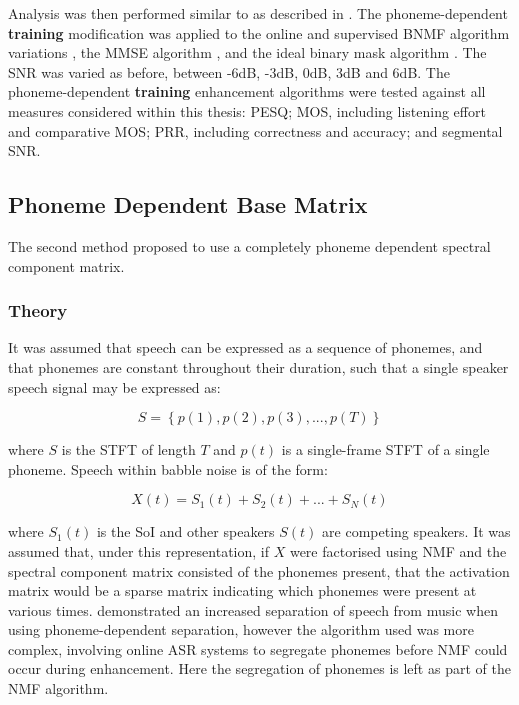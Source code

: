 Analysis was then performed similar to as described in .
The phoneme-dependent \textbf{training} modification was applied to
the online and supervised \ac{BNMF} algorithm variations \citep{mohammadiha2013supervised},
the \ac{MMSE} algorithm \citep{Brookes1997}, and the ideal binary
mask algorithm \citep{Wojcicki2011}. The \ac{SNR} was varied as
before, between -6dB, -3dB, 0dB, 3dB and 6dB. The phoneme-dependent\textbf{
training} enhancement algorithms were tested against all measures
considered within this thesis: \ac{PESQ}; \ac{MOS}, including listening
effort and comparative \ac{MOS}; \ac{PRR}, including correctness
and accuracy; and segmental \ac{SNR}.


\subsection{\label{sub:Phoneme-Base}Phoneme Dependent Base Matrix}

The second method proposed to use a completely phoneme dependent spectral
component matrix.


\subsubsection*{Theory}

It was assumed that speech can be expressed as a sequence of phonemes,
and that phonemes are constant throughout their duration, such that
a single speaker speech signal may be expressed as:

\[
S=\left\{ p\left(1\right),p\left(2\right),p\left(3\right),...,p\left(T\right)\right\} 
\]



where $S$ is the \ac{STFT} of length $T$ and $p\left(t\right)$
is a single-frame \ac{STFT} of a single phoneme. Speech within babble
noise is of the form:

\[
X\left(t\right)=S_{1}\left(t\right)+S_{2}\left(t\right)+...+S_{N}\left(t\right)
\]


where $S_{1}\left(t\right)$ is the \ac{SoI} and other speakers $S\left(t\right)$
are competing speakers. It was assumed that, under this representation,
if $X$ were factorised using \ac{NMF} and the spectral component
matrix consisted of the phonemes present, that the activation matrix
would be a sparse matrix indicating which phonemes were present at
various times. \citet{Raj2011} demonstrated an increased separation
of speech from music when using phoneme-dependent separation, however
the algorithm used was more complex, involving online \ac{ASR} systems
to segregate phonemes before \ac{NMF} could occur during enhancement.
Here the segregation of phonemes is left as part of the \ac{NMF}
algorithm.


